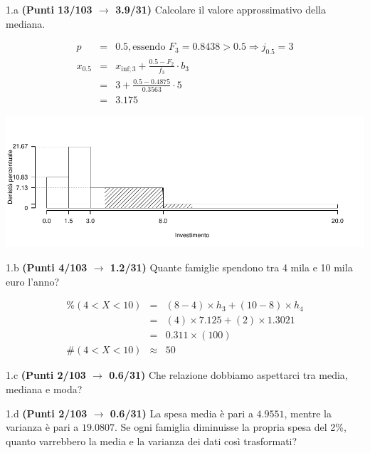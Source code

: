 \documentclass[
  11pt,
]{book}
\theoremstyle{mytheoremstyle}
\theoremstyle{mydefstyle}
\newenvironment{sol}
  {
  \begin{tcolorbox}[enhanced,breakable,arc=0.1mm,boxrule=1pt,colback=white,colframe=iblue,
  title=\bf \fontfamily{lmss}\selectfont \hspace{.5 cm} Soluzione,drop fuzzy shadow]

}{
\end{tcolorbox}
  }
\begin{document}
1.a \textbf{(Punti 13/103 \(\rightarrow\) 3.9/31)} Calcolare il valore approssimativo della mediana.

\begin{sol}

\begin{eqnarray*}
  p &=&  0.5 , \text{essendo }F_{ 3 }= 0.8438  > 0.5  \Rightarrow j_{ 0.5 }= 3 \\
  x_{ 0.5 } &=& x_{\text{inf}; 3 } + \frac{ { 0.5 } - F_{ 2 }} {f_{ 3 }} \cdot b_{ 3 } \\
            &=&  3  + \frac {{ 0.5 } -  0.4875 } { 0.3563 } \cdot  5  \\
            &=&  3.175 
\end{eqnarray*}

\begin{center}\includegraphics{Esami_passati_con_soluzioni_files/figure-latex/2024-63-1} \end{center}

\end{sol}

1.b \textbf{(Punti 4/103 \(\rightarrow\) 1.2/31)} Quante famiglie spendono tra 4 mila e 10 mila euro l'anno?

\begin{sol}
\begin{eqnarray*} \%(4<X<10) &=& (8-4)\times h_{3}+  (10-8)\times h_{4}  \\ 
 &=& (4)\times 7.125+  (2)\times 1.3021  \\ 
 &=&  0.311 \times(100)\\
     \#( 4 < X < 10 ) &\approx& 50 
         \end{eqnarray*}

\end{sol}

1.c \textbf{(Punti 2/103 \(\rightarrow\) 0.6/31)} Che relazione dobbiamo aspettarci tra media, mediana e moda?

1.d \textbf{(Punti 2/103 \(\rightarrow\) 0.6/31)} La spesa media è pari a \(4.9551\), mentre la varianza è pari a \(19.0807\).
Se ogni famiglia diminuisse la propria spesa del 2\%, quanto varrebbero la media e la varianza dei dati così trasformati?
\end{document}
